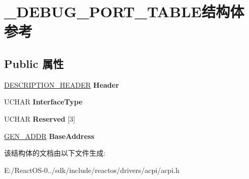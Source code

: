 \hypertarget{struct___d_e_b_u_g___p_o_r_t___t_a_b_l_e}{}\section{\+\_\+\+D\+E\+B\+U\+G\+\_\+\+P\+O\+R\+T\+\_\+\+T\+A\+B\+L\+E结构体 参考}
\label{struct___d_e_b_u_g___p_o_r_t___t_a_b_l_e}
\subsection*{Public 属性}
\begin{DoxyCompactItemize}
\item 
\mbox{\label{struct___d_e_b_u_g___p_o_r_t___t_a_b_l_e_aeec0e73cde7535d519a8903e23e5551e}} 
\hyperlink{struct___d_e_s_c_r_i_p_t_i_o_n___h_e_a_d_e_r}{D\+E\+S\+C\+R\+I\+P\+T\+I\+O\+N\+\_\+\+H\+E\+A\+D\+ER} {\bfseries Header}
\item 
\mbox{\label{struct___d_e_b_u_g___p_o_r_t___t_a_b_l_e_a352779f1b3fa09a4372661ed8d8b277e}} 
U\+C\+H\+AR {\bfseries Interface\+Type}
\item 
\mbox{\label{struct___d_e_b_u_g___p_o_r_t___t_a_b_l_e_a36dff046ed49919042b2933454c041b8}} 
U\+C\+H\+AR {\bfseries Reserved} \mbox{[}3\mbox{]}
\item 
\mbox{\label{struct___d_e_b_u_g___p_o_r_t___t_a_b_l_e_a9667e6956c2353af4b60cf1d728f05c2}} 
\hyperlink{struct___g_e_n___a_d_d_r}{G\+E\+N\+\_\+\+A\+D\+DR} {\bfseries Base\+Address}
\end{DoxyCompactItemize}


该结构体的文档由以下文件生成\+:\begin{DoxyCompactItemize}
\item 
E\+:/\+React\+O\+S-\/0../sdk/include/reactos/drivers/acpi/acpi.\+h\end{DoxyCompactItemize}
